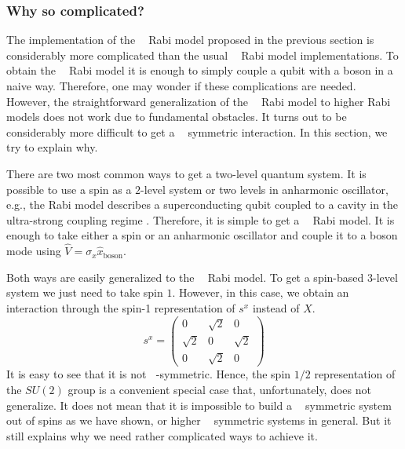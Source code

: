 \documentclass[reprint, aps, prx, amsmath, amssymb, longbibliography, superscriptaddress]{revtex4-2}
\DeclareMathOperator{\Zn}{\mathbb{Z}_n}
\DeclareMathOperator{\Zthree}{\mathbb{Z}_3}
\DeclareMathOperator{\Ztwo}{\mathbb{Z}_2}
\begin{document}
\subsubsection{Why so complicated?}

The implementation of the $\Zthree$ Rabi model proposed in the previous section is considerably more complicated than the usual $\Ztwo$ Rabi model implementations. To obtain the $\Ztwo$ Rabi model it is enough to simply couple a qubit with a boson in a naive way. Therefore, one may wonder if these complications are needed. However, the straightforward generalization of the $\Ztwo$ Rabi model to higher Rabi models does not work due to fundamental obstacles. It turns out to be considerably more difficult to get a $\Zthree$ symmetric interaction. In this section, we try to explain why.

There are two most common ways to get a two-level quantum system. It is possible to use a spin as a $2$-level system  \cite{bosco_fully_2022,felicetti_quantum_2017,skogvoll_tunable_2021} or two levels in anharmonic oscillator, e.g., the Rabi model describes a superconducting qubit coupled to a cavity in the ultra-strong coupling regime \cite{niemczyk_circuit_2010,forn-diaz_ultrastrong_2017,yoshihara_superconducting_2017,vlasiuk_cavityinduced_2023, kozin_quantum_2024,chen_singlephotondriven_2017,PhysRevA.106.023702}. Therefore, it is simple to get a $\Ztwo$ Rabi model. It is enough to take either a spin or an anharmonic oscillator and couple it to a boson mode using $\hat V = \sigma_x \hat x_{\text{boson}}$.

Both ways are easily generalized to the $\Zthree$ Rabi model. To get a spin-based 3-level system we just need to take spin $1$. However, in this case, we obtain an interaction through the spin-1 representation of $s^x$ instead of $X$.
\begin{equation}
    s^x= \begin{pmatrix} 0 & \sqrt{2} & 0 \\ \sqrt{2} & 0 & \sqrt{2} \\ 0 & \sqrt{2} & 0 \end{pmatrix}
\end{equation}
It is easy to see that it is not $\Zthree$-symmetric. Hence, the spin $1/2$ representation of the $SU(2)$ group is a convenient special case that, unfortunately, does not generalize. It does not mean that it is impossible to build a $\Zthree$ symmetric system out of spins as we have shown, or higher $\Zn$ symmetric systems \cite{hutter_parafermions_2015} in general. But it still explains why we need rather complicated ways to achieve it.
\end{document}
